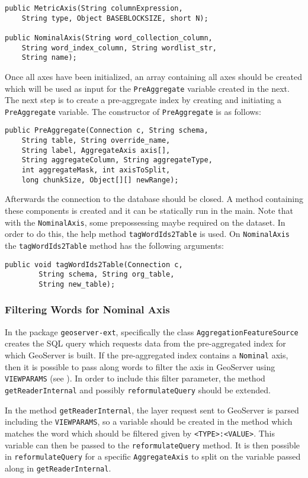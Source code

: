 \begin{lstlisting}
public MetricAxis(String columnExpression,
	String type, Object BASEBLOCKSIZE, short N);
	
public NominalAxis(String word_collection_column, 
	String word_index_column, String wordlist_str, 
	String name);
\end{lstlisting}

Once all axes have been initialized, an array containing all axes should be
created which will be used as input for the \lstinline|PreAggregate|
variable created in the next. The next step is to create a pre-aggregate
index by creating and initiating a \lstinline|PreAggregate| variable. The
constructor of \lstinline|PreAggregate| is as follows:

\begin{lstlisting}
public PreAggregate(Connection c, String schema,
	String table, String override_name,
	String label, AggregateAxis axis[],
	String aggregateColumn, String aggregateType,
	int aggregateMask, int axisToSplit,
	long chunkSize, Object[][] newRange);
\end{lstlisting}

Afterwards the connection to the database should be closed. A method
containing these components is created and it can be statically run in the
main. Note that with the \lstinline|NominalAxis|, some prepossessing maybe
required on the dataset. In order to do this, the help method
\lstinline|tagWordIds2Table| is used. On \lstinline|NominalAxis| the
\lstinline|tagWordIds2Table| method has the following arguments:

\begin{lstlisting}
public void tagWordIds2Table(Connection c, 
		String schema, String org_table, 
		String new_table);
\end{lstlisting}

\subsubsection{Filtering Words for Nominal Axis}
\label{sec:filtering}

In the package \lstinline|geoserver-ext|, specifically the class
\lstinline|AggregationFeatureSource| creates the SQL query which requests
data from the pre-aggregated index for which GeoServer is built. If the
pre-aggregated index contains a \lstinline|Nominal| axis, then it is
possible to pass along words to filter the axis in GeoServer using
\lstinline|VIEWPARAMS| (see ). In order to include
this filter parameter, the method \lstinline|getReaderInternal| and possibly
\lstinline|reformulateQuery| should be extended.

In the method \lstinline|getReaderInternal|, the layer request sent to
GeoServer is parsed including the \lstinline|VIEWPARAMS|, so a variable
should be created in the method which matches the word which should be
filtered given by \lstinline|<TYPE>:<VALUE>|. This variable can then be
passed to the \lstinline|reformulateQuery| method. It is then possible in
\lstinline|reformulateQuery| for a specific \lstinline|AggregateAxis| to
split on the variable passed along in \lstinline|getReaderInternal|.
